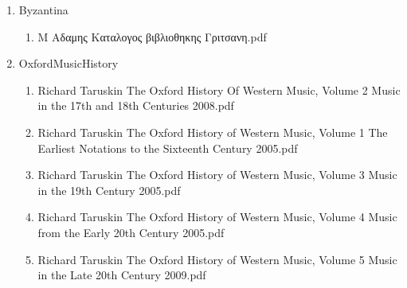 \documentclass[11pt]{article}
\begin{document}
\begin{enumerate}
\item Byzantina
\label{sec-1-1-1-1-31-11-9}
\begin{enumerate}
\item Μ Αδαμης Καταλογος βιβλιοθηκης Γριτσανη.pdf
\label{sec-1-1-1-1-31-11-9-1}
\end{enumerate}

\item OxfordMusicHistory
\label{sec-1-1-1-1-31-11-10}
\begin{enumerate}
\item Richard Taruskin The Oxford History Of Western Music, Volume 2 Music in the 17th and 18th Centuries    2008.pdf
\label{sec-1-1-1-1-31-11-10-1}

\item Richard Taruskin The Oxford History of Western Music, Volume 1 The Earliest Notations to the Sixteenth Century    2005.pdf
\label{sec-1-1-1-1-31-11-10-2}

\item Richard Taruskin The Oxford History of Western Music, Volume 3 Music in the 19th Century    2005.pdf
\label{sec-1-1-1-1-31-11-10-3}

\item Richard Taruskin The Oxford History of Western Music, Volume 4 Music from the Early 20th Century    2005.pdf
\label{sec-1-1-1-1-31-11-10-4}

\item Richard Taruskin The Oxford History of Western Music, Volume 5 Music in the Late 20th Century    2009.pdf
\label{sec-1-1-1-1-31-11-10-5}
\end{enumerate}
\end{enumerate}
\end{document}
